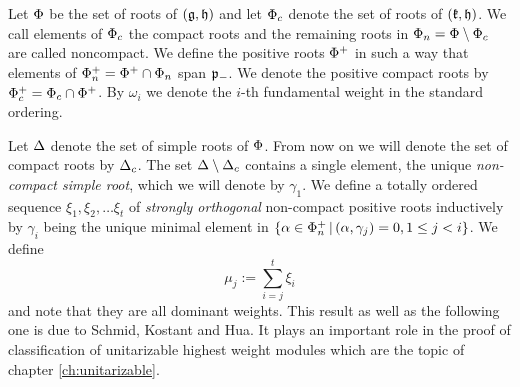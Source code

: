 Let $\Phi$ be the set of roots of $(\mathfrak{g},\mathfrak{h})$ and let $\Phi_c$ denote the set of roots of $(\mathfrak{k},\mathfrak{h})$. We call elements of $\Phi_c$ the compact roots and the remaining roots in $\Phi_n = \Phi \setminus \Phi_c$ are called noncompact. We define the positive roots $\Phi^+$ in such a way that elements of $\Phi_n^+ = \Phi^+ \cap \Phi_n$ span $\mathfrak{p}_-$. We denote the positive compact roots by $\Phi^+_c = \Phi_c \cap \Phi^+$. By $\omega_i$ we denote the $i$-th fundamental weight in the standard ordering.


Let $\Delta$ denote the set of  simple roots of $\Phi$. From now on we will denote the set of compact roots by $\Delta_c$. The set $\Delta\setminus \Delta_c$ contains a single element, the unique \emph{non-compact simple root}, which we will denote by $\gamma_1$. We define a totally ordered sequence $\xi_1,\xi_2,\ldots \xi_t$ of \emph{strongly orthogonal} non-compact positive roots inductively by $\gamma_i$ being the unique minimal element in $\{ \alpha \in \Phi_n^+ \,|\, (\alpha, \gamma_j) = 0, 1 \leq j < i\}$. We define
\[\mu_j := \sum_{i=j}^t \xi_i\]
and note that they are all dominant weights. This result as well as the following one is due to Schmid, Kostant and Hua. It plays an important role in the proof of classification of unitarizable highest weight modules \cite{enright_intrinsic_1990} which are the topic of chapter \ref{ch:unitarizable}.


